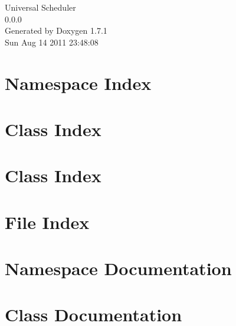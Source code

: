 \documentclass[a4paper]{book}
\begin{document}
\hypersetup{pageanchor=false}
\begin{titlepage}
\vspace*{7cm}
\begin{center}
{\Large Universal Scheduler \\[1ex]\large 0.0.0 }\\
\vspace*{1cm}
{\large Generated by Doxygen 1.7.1}\\
\vspace*{0.5cm}
{\small Sun Aug 14 2011 23:48:08}\\
\end{center}
\end{titlepage}
\clearemptydoublepage
{}
\tableofcontents
\clearemptydoublepage
{}
\hypersetup{pageanchor=true}
\chapter{Namespace Index}

\chapter{Class Index}

\chapter{Class Index}

\chapter{File Index}

\chapter{Namespace Documentation}


\chapter{Class Documentation}






























\end{document}
